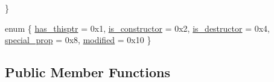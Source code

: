 \begin{DoxyCompactItemize}
 \}
\item 
enum \{ \newline
\mbox{\hyperlink{class_pcode_op_adf54b281171a722dd3395c142d42078ea57e912d373e43166d8e585ccd7d08607}{has\+\_\+thisptr}} = 0x1, 
\mbox{\hyperlink{class_pcode_op_adf54b281171a722dd3395c142d42078ea877c219d6b9a698f3f60c571a7d73224}{is\+\_\+constructor}} = 0x2, 
\mbox{\hyperlink{class_pcode_op_adf54b281171a722dd3395c142d42078eabff403904780e3e1cddd783fa3ef0322}{is\+\_\+destructor}} = 0x4, 
\mbox{\hyperlink{class_pcode_op_adf54b281171a722dd3395c142d42078eabca77d05804c71b79b4192687f34105f}{special\+\_\+prop}} = 0x8, 
\newline
\mbox{\hyperlink{class_pcode_op_adf54b281171a722dd3395c142d42078eae6091fc405524c4cc5baa63e860b9a98}{modified}} = 0x10
 \}
\end{DoxyCompactItemize}
\subsection*{Public Member Functions}
